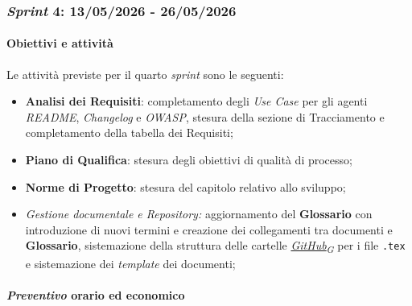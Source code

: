 \documentclass[12pt, a4paper]{article}
\newcommand{\urlglossario}{https://skynetunigroup.github.io/Code_Guardian/Documentazione/PB/glossario_v2.0.0.pdf} %
\newcommand{\glo}[2]{\href{\urlglossario\#nameddest=#2}{#1\textsubscript{G}}}
\begin{document}
{\subsubsection{\textit{Sprint} 4: 13/05/2026 - 26/05/2026}

\paragraph{Obiettivi e attività}

Le attività previste per il quarto \textit{sprint} sono le seguenti:

\begin{itemize}
    \item \textbf{Analisi dei Requisiti}: completamento degli \textit{Use Case} per gli agenti \textit{README}, \textit{Changelog} e \textit{OWASP}, stesura della sezione di Tracciamento e completamento della tabella dei Requisiti;
\item \textbf{Piano di Qualifica}: stesura degli obiettivi di qualità di processo;
\item \textbf{Norme di Progetto}: stesura del capitolo relativo allo sviluppo;
\item \emph{Gestione documentale e \textit{Repository}:} aggiornamento del \textbf{Glossario} con introduzione di nuovi termini e creazione dei collegamenti tra documenti e \textbf{Glossario}, sistemazione della struttura delle cartelle \textit{\glo{GitHub}{github}} per i file \texttt{.tex} e sistemazione dei \textit{template} dei documenti;
\end{itemize}

\paragraph{\textit{Preventivo} orario ed economico}

}
\end{document}
